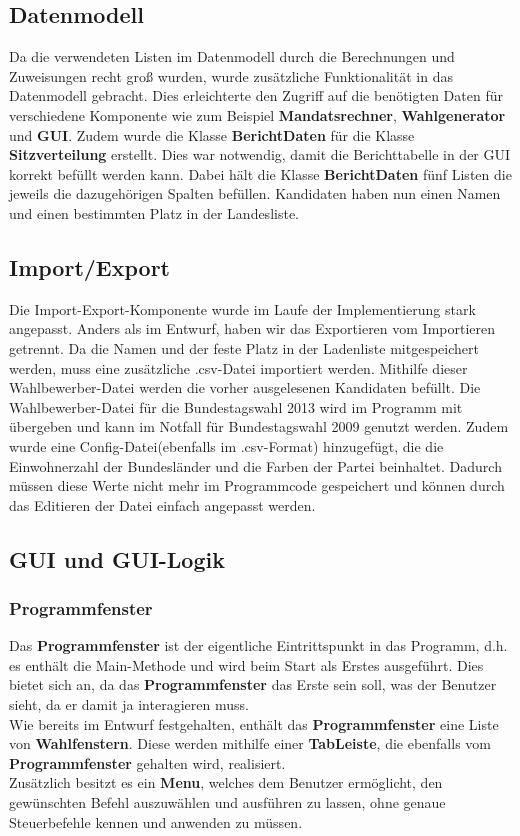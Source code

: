 \documentclass[12pt,a4paper,titlepage]{article}
\newcommand{\myma}{\fontfamily{pcr}\selectfont \textbf}
\begin{document}
\subsection{Datenmodell}
Da die verwendeten Listen im Datenmodell durch die Berechnungen und Zuweisungen recht groß wurden, wurde zusätzliche Funktionalität in das Datenmodell gebracht. Dies erleichterte den Zugriff auf die benötigten Daten für verschiedene Komponente wie zum Beispiel {\myma{Mandatsrechner}}, {\myma{Wahlgenerator}} und {\myma{GUI}}.
Zudem wurde die Klasse {\myma{BerichtDaten}} für die Klasse {\myma{Sitzverteilung}} erstellt. Dies war notwendig, damit die Berichttabelle in der GUI korrekt befüllt werden kann. Dabei hält die Klasse {\myma{BerichtDaten}} fünf Listen die jeweils die dazugehörigen Spalten befüllen. 
Kandidaten haben nun einen Namen und einen bestimmten Platz in der Landesliste.

\subsection{Import/Export}	
Die Import-Export-Komponente wurde im Laufe der Implementierung stark angepasst. Anders als im Entwurf, haben wir das Exportieren vom Importieren getrennt. Da die Namen und der feste Platz in der Ladenliste mitgespeichert werden, muss eine zusätzliche .csv-Datei importiert werden. Mithilfe dieser Wahlbewerber-Datei werden die vorher ausgelesenen Kandidaten befüllt. Die Wahlbewerber-Datei für die Bundestagswahl 2013 wird im Programm mit übergeben und kann im Notfall für Bundestagswahl 2009 genutzt werden. Zudem wurde eine Config-Datei(ebenfalls im .csv-Format) hinzugefügt, die die Einwohnerzahl der Bundesländer und die Farben der Partei beinhaltet. Dadurch müssen diese Werte nicht mehr im Programmcode gespeichert und können durch das Editieren der Datei einfach angepasst werden. 

\subsection{GUI und GUI-Logik}

\subsubsection{Programmfenster}
Das {\myma{Programmfenster}} ist der eigentliche Eintrittspunkt in das Programm, d.h. es enthält die Main-Methode und wird beim Start als Erstes ausgeführt. Dies bietet sich an, da das {\myma{Programmfenster}} das Erste sein soll, was der Benutzer sieht, da er damit ja interagieren muss. \\
Wie bereits im Entwurf festgehalten, enthält das {\myma{Programmfenster}} eine Liste von {\myma{Wahlfenstern}}. Diese werden mithilfe einer {\myma{TabLeiste}}, die ebenfalls vom {\myma{Programmfenster}} gehalten wird, realisiert. \\
Zusätzlich besitzt es ein {\myma{Menu}}, welches dem Benutzer ermöglicht, den gewünschten Befehl auszuwählen und ausführen zu lassen, ohne genaue Steuerbefehle kennen und anwenden zu müssen. \\
\end{document}

